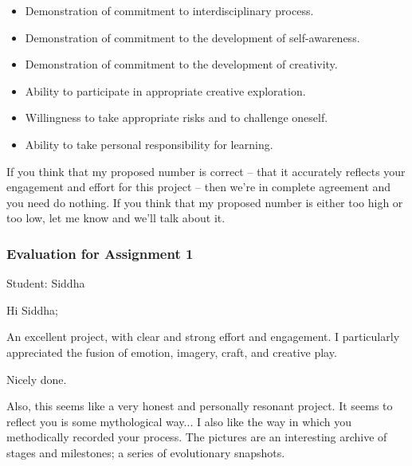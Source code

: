 \documentclass[letterpaper,10pt,DIV=9,headsepline]{scrreprt}
\begin{document}
\begin{itemize}
\item Demonstration of commitment to interdisciplinary process.
\item Demonstration of commitment to the development of self-awareness.
\item Demonstration of commitment to the development of creativity.
\item Ability to participate in appropriate creative exploration.
\item Willingness to take appropriate risks and to challenge oneself.
\item Ability to take personal responsibility for learning.
\end{itemize}

If you think that my proposed number is correct -- that it accurately
reflects your engagement and effort for this project -- then we're in
complete agreement and you need do nothing. If you think that my
proposed number is either too high or too low, let me know and we'll
talk about it.

\newpage

\subsubsection{Evaluation for Assignment 1}

Student: Siddha

\bigskip
Hi Siddha;

An excellent project, with clear and strong effort and engagement. I
particularly appreciated the fusion of emotion, imagery, craft, and
creative play.

Nicely done.

Also, this seems like a very honest and personally resonant project.
It seems to reflect you is some mythological way... I also like the way in which you methodically recorded your process. The pictures are an interesting archive of stages and milestones; a series of evolutionary snapshots.


\end{document}
